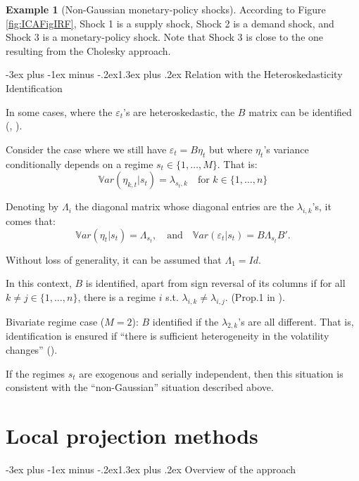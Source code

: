 \documentclass[
  11pt,
]{book}
\makeatletter
\renewcommand\section{\@startsection{section}{1}{\z@}
  {-3ex plus -1ex minus -.2ex}{1.3ex plus .2ex}
  {\normalfont\Large\bfseries\color{TextbookInk}}}
\theoremstyle{definition}
\theoremstyle{definition}
\newtheorem{example}{Example}[chapter]
\theoremstyle{definition}
\theoremstyle{definition}
\theoremstyle{remark}
\makeatother
\begin{document}
\begin{example}[Non-Gaussian monetary-policy shocks]
According to Figure \ref{fig:ICAFigIRF}, Shock 1 is a supply shock, Shock 2 is a demand shock, and Shock 3 is a monetary-policy shock. Note that Shock 3 is close to the one resulting from the Cholesky approach.
\end{example}

\section{Relation with the Heteroskedasticity Identification}\label{relation-with-the-heteroskedasticity-identification}

In some cases, where the \(\varepsilon_t\)'s are heteroskedastic, the \(B\) matrix can be identified (\citet{Rigobon_2003}, \citet{LANNE2010121}).

Consider the case where we still have \(\varepsilon_t = B \eta_t\) but where \(\eta_t\)'s variance conditionally depends on a regime \(s_t \in \{1,\dots,M\}\). That is:
\[
\mathbb{V}ar(\eta_{k,t}|s_t) = \lambda_{s_t,k} \quad \mbox{for } k \in \{1,\dots,n\}
\]

Denoting by \(\Lambda_i\) the diagonal matrix whose diagonal entries are the \(\lambda_{i,k}\)'s, it comes that:
\[
\mathbb{V}ar(\eta_{t}|s_t) = \Lambda_{s_t},\quad \mbox{and}\quad \mathbb{V}ar(\varepsilon_{t}|s_t) = B\Lambda_{s_t}B'.
\]

Without loss of generality, it can be assumed that \(\Lambda_1=Id\).

In this context, \(B\) is identified, apart from sign reversal of its columns if for all \(k \ne j \in \{1,\dots,n\}\), there is a regime \(i\) s.t. \(\lambda_{i,k} \ne \lambda_{i,j}\). (Prop.1 in \citet{LANNE2010121}).

Bivariate regime case (\(M=2\)): \(B\) identified if the \(\lambda_{2,k}\)'s are all different. That is, identification is ensured if ``there is sufficient heterogeneity in the volatility changes'' (\citet{LUTKEPOHL20172}).

If the regimes \(s_t\) are exogenous and serially independent, then this situation is consistent with the ``non-Gaussian'' situation described above.

\chapter{Local projection methods}\label{Projections}

\section{Overview of the approach}\label{overview-of-the-approach}
\end{document}
